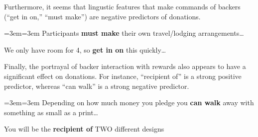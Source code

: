 \documentclass[letterpaper]{article}
\newenvironment{blockquote}{%
  \setlength{\parskip}{.5em}
  \par%
  \small
  \medskip
  \leftskip=3em\rightskip=3em%
  \noindent\ignorespaces}{%
  \par\medskip}
\begin{document}
Furthermore, it seems that lingustic features that make commands of backers (``get in on,'' ``must make'') are negative predictors of donations.
\begin{blockquote}
Participants \textbf{must make} their own travel/lodging arrangements\ldots\par\noindent
We only have room for 4, so \textbf{get in on} this quickly\ldots
\end{blockquote}
Finally, the portrayal of backer interaction with rewards also appears to have a significant effect on donations. For instance, ``recipient of'' is a strong positive predictor, whereas ``can walk'' is a strong negative predictor.
\begin{blockquote}
Depending on how much money you pledge you \textbf{can walk} away with something as small as a print\ldots\par\noindent
You will be the \textbf{recipient of} TWO different designs
\end{blockquote}
\end{document}
